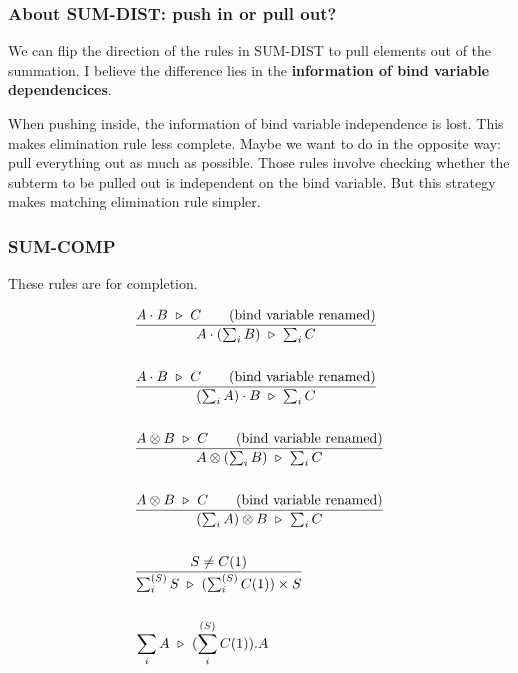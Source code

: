 \subsubsection*{About \textsf{SUM-DIST}: push in or pull out?}
We can flip the direction of the rules in \textsf{SUM-DIST} to pull elements out of the summation. I believe the difference lies in the \textbf{information of bind variable dependencices}.

When pushing inside, the information of bind variable independence is lost. This makes elimination rule less complete. Maybe we want to do in the opposite way: pull everything out as much as possible. Those rules involve checking whether the subterm to be pulled out is independent on the bind variable. But this strategy makes matching elimination rule simpler.


\subsubsection*{\textsf{SUM-COMP}}
These rules are for completion.

\begin{align*}
  & \frac{A \cdot B \ \triangleright\  C \qquad \text{(bind variable renamed)}}{A \cdot (\sum_i B) \ \triangleright\  \sum_i C} \\
  \\
  & \frac{A \cdot B \ \triangleright\  C \qquad \text{(bind variable renamed)}}{(\sum_i A) \cdot B \ \triangleright\  \sum_i C} \\
  \\
  & \frac{A \otimes B \ \triangleright\  C \qquad \text{(bind variable renamed)}}{A \otimes (\sum_i B) \ \triangleright\  \sum_i C} \\
  \\
  & \frac{A \otimes B \ \triangleright\  C \qquad \text{(bind variable renamed)}}{(\sum_i A) \otimes B \ \triangleright\  \sum_i C} \\
  \\
  & \frac{S \neq C(1)}{\sum_i^{(S)} S \ \triangleright\  (\sum^{(S)}_i C(1)) \times S} \\
  \\
  & \sum_i A \ \triangleright\  (\sum^{(S)}_i C(1)).A
\end{align*}


